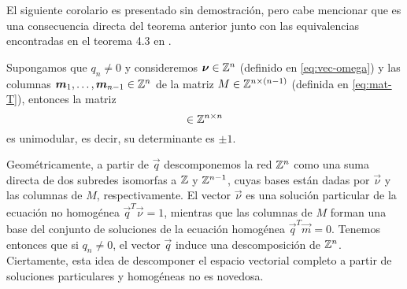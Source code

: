 El siguiente corolario es presentado sin demostración, pero cabe mencionar que es una consecuencia
directa del teorema anterior junto con las equivalencias encontradas en el teorema 4.3 en \cite{alex}.
\begin{corollary}
	\label{cor:unimodular}
	Supongamos que $q_n \neq 0$ y consideremos $\boldsymbol{\nu} \in \mathbb{Z}^n$ (definido en
	\eqref{eq:vec-omega}) y las columnas $\boldsymbol{m}_1, \ldots, \boldsymbol{m}_{n-1} \in \mathbb{Z}^n$ de la matriz $M
	\in \mathbb{Z}^{n \times (n-1)}$ (definida en \eqref{eq:mat-T}), entonces la matriz
	\begin{equation*}
		[ \vec{\nu} \mid \vec{m}_1 \mid \cdots \mid \vec{m}_{n-1} ] \in \Z^{n \times n}
	\end{equation*}
	es unimodular, es decir, su determinante es $\pm 1$.
\end{corollary}

Geométricamente, a partir de $\vec{q}$ descomponemos la red $\mathbb{Z}^n$ como una suma directa de dos
subredes isomorfas a $\mathbb{Z}$ y $\mathbb{Z}^{n-1}$, cuyas bases están dadas por $\vec{\nu}$ y las columnas de
$M$, respectivamente. El vector $\vec{\nu}$ es una solución particular de la ecuación no
homogénea $\vec{q}^T\vec{\nu} = 1$, mientras que las columnas de $M$ forman una base del conjunto
de soluciones de la ecuación homogénea $\vec{q}^T\vec{m} = 0$. Tenemos entonces que si $q_n \neq 0$,
el vector $\vec{q}$ induce una descomposición de $\mathbb{Z}^n$. Ciertamente, esta idea de descomponer el
espacio vectorial completo a partir de soluciones particulares y homogéneas no es novedosa.


